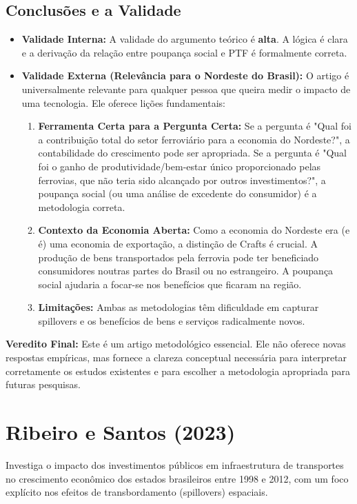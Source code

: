 \documentclass[12pt, a4paper]{article}
\begin{document}
\subsection{Conclusões e a Validade}
\begin{itemize}
    \item \textbf{Validade Interna:} A validade do argumento teórico é \textbf{alta}. A lógica é clara e a derivação da relação entre poupança social e PTF é formalmente correta.
    \item \textbf{Validade Externa (Relevância para o Nordeste do Brasil):} O artigo é universalmente relevante para qualquer pessoa que queira medir o impacto de uma tecnologia. Ele oferece lições fundamentais:
        \begin{enumerate}
            \item \textbf{Ferramenta Certa para a Pergunta Certa:} Se a pergunta é "Qual foi a contribuição total do setor ferroviário para a economia do Nordeste?", a contabilidade do crescimento pode ser apropriada. Se a pergunta é "Qual foi o ganho de produtividade/bem-estar único proporcionado pelas ferrovias, que não teria sido alcançado por outros investimentos?", a poupança social (ou uma análise de excedente do consumidor) é a metodologia correta.
            \item \textbf{Contexto da Economia Aberta:} Como a economia do Nordeste era (e é) uma economia de exportação, a distinção de Crafts é crucial. A produção de bens transportados pela ferrovia pode ter beneficiado consumidores noutras partes do Brasil ou no estrangeiro. A poupança social ajudaria a focar-se nos benefícios que ficaram na região.
            \item \textbf{Limitações:} Ambas as metodologias têm dificuldade em capturar spillovers e os benefícios de bens e serviços radicalmente novos.
        \end{enumerate}
\end{itemize}

\noindent\textbf{Veredito Final:} Este é um artigo metodológico essencial. Ele não oferece novas respostas empíricas, mas fornece a clareza conceptual necessária para interpretar corretamente os estudos existentes e para escolher a metodologia apropriada para futuras pesquisas. 

\section{Ribeiro e Santos (2023)}
Investiga o impacto dos investimentos públicos em infraestrutura de transportes no crescimento econômico dos estados brasileiros entre 1998 e 2012, com um foco explícito nos efeitos de transbordamento (spillovers) espaciais.
\end{document}
